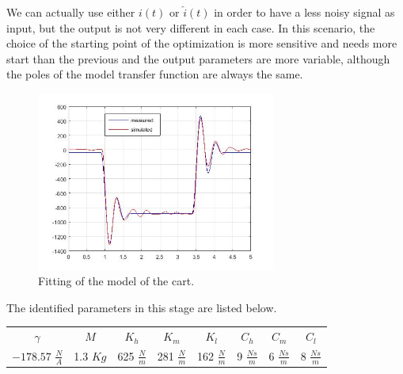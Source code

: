 We can actually use either $i(t)$ or $\hat{i}(t)$ in order to have a less noisy signal as input, but the output is not very different in each case. In this scenario, the choice of the starting point of the optimization is more sensitive and needs more start than the previous and the output parameters are more variable, although the poles of the model transfer function are always the same.
\begin{figure}[h]
\centering
\includegraphics[width=0.7\textwidth]{img/graybox_cart.jpg}
\caption{Fitting of the model of the cart.}
\end{figure}

The identified parameters in this stage are listed below.
\begin{table}[h]
\centering
\begin{tabular}{|c|c|c|c|c|c|c|c|}
	$\gamma$ & $M$ & $K_h$ & $K_m$ & $K_l$ & $C_h$ & $C_m$ & $C_l$ \\
	$-178.57$ $\frac{N}{A}$ & 1.3 $Kg$ & 625 $\frac{N}{m}$ & 281 $\frac{N}{m}$ & 162 $\frac{N}{m}$ & 9 $\frac{Ns}{m}$ & 6 $\frac{Ns}{m}$ & 8 $\frac{Ns}{m}$\\
\end{tabular}
\end{table}






